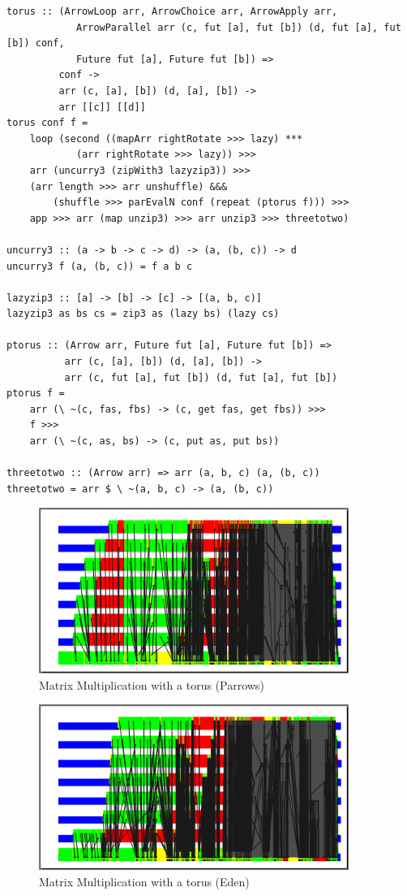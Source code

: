 \begin{lstlisting}[frame=htrbl]
torus :: (ArrowLoop arr, ArrowChoice arr, ArrowApply arr,
            ArrowParallel arr (c, fut [a], fut [b]) (d, fut [a], fut [b]) conf,
            Future fut [a], Future fut [b]) =>
         conf ->
         arr (c, [a], [b]) (d, [a], [b]) ->
         arr [[c]] [[d]]
torus conf f =
	loop (second ((mapArr rightRotate >>> lazy) ***
			(arr rightRotate >>> lazy)) >>>
    arr (uncurry3 (zipWith3 lazyzip3)) >>>
    (arr length >>> arr unshuffle) &&&
        (shuffle >>> parEvalN conf (repeat (ptorus f))) >>>
    app >>> arr (map unzip3) >>> arr unzip3 >>> threetotwo)

uncurry3 :: (a -> b -> c -> d) -> (a, (b, c)) -> d
uncurry3 f (a, (b, c)) = f a b c

lazyzip3 :: [a] -> [b] -> [c] -> [(a, b, c)]
lazyzip3 as bs cs = zip3 as (lazy bs) (lazy cs)

ptorus :: (Arrow arr, Future fut [a], Future fut [b]) =>
          arr (c, [a], [b]) (d, [a], [b]) ->
          arr (c, fut [a], fut [b]) (d, fut [a], fut [b])
ptorus f =
	arr (\ ~(c, fas, fbs) -> (c, get fas, get fbs)) >>>
	f >>>
	arr (\ ~(c, as, bs) -> (c, put as, put bs))

threetotwo :: (Arrow arr) => arr (a, b, c) (a, (b, c))
threetotwo = arr $ \ ~(a, b, c) -> (a, (b, c))
\end{lstlisting}

\begin{figure}[ht]
	\centering
	\includegraphics[width=0.9\textwidth]{images/torus_matrix_parrows}
	\caption[without Futures]{Matrix Multiplication with a torus (Parrows)}
\end{figure}

\begin{figure}[ht]
	\centering
	\includegraphics[width=0.9\textwidth]{images/torus_matrix_eden}
	\caption[with Futures]{Matrix Multiplication with a torus (Eden)}
\end{figure}